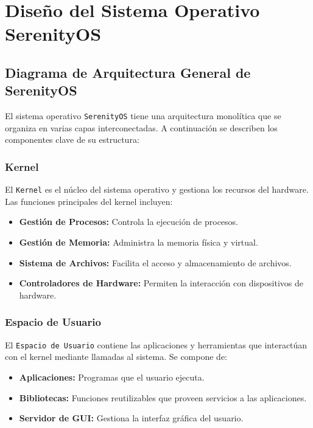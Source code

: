 \section{Diseño del Sistema Operativo SerenityOS}
\subsection{Diagrama de Arquitectura General de SerenityOS}

El sistema operativo \texttt{SerenityOS} tiene una arquitectura monolítica que se organiza en varias capas interconectadas. A continuación se describen los componentes clave de su estructura:

\subsubsection{Kernel}
El \texttt{Kernel} es el núcleo del sistema operativo y gestiona los recursos del hardware. Las funciones principales del kernel incluyen:
\begin{itemize}
    \item \textbf{Gestión de Procesos:} Controla la ejecución de procesos.
    \item \textbf{Gestión de Memoria:} Administra la memoria física y virtual.
    \item \textbf{Sistema de Archivos:} Facilita el acceso y almacenamiento de archivos.
    \item \textbf{Controladores de Hardware:} Permiten la interacción con dispositivos de hardware.
\end{itemize}

\subsubsection{Espacio de Usuario}
El \texttt{Espacio de Usuario} contiene las aplicaciones y herramientas que interactúan con el kernel mediante llamadas al sistema. Se compone de:
\begin{itemize}
    \item \textbf{Aplicaciones:} Programas que el usuario ejecuta.
    \item \textbf{Bibliotecas:} Funciones reutilizables que proveen servicios a las aplicaciones.
    \item \textbf{Servidor de GUI:} Gestiona la interfaz gráfica del usuario.
\end{itemize}

